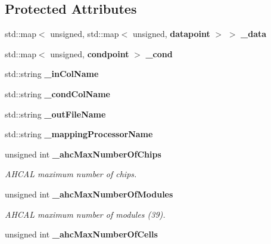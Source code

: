 \subsection*{Protected Attributes}
\begin{DoxyCompactItemize}
\item 
std::map$<$ unsigned, std::map$<$ unsigned, {\bf datapoint} $>$ $>$ {\bfseries \_\-data}\label{classExtractIntercalibrationProcessor_adf4e67f38b5b2e34e362fc2a03ed26f2}

\item 
std::map$<$ unsigned, {\bf condpoint} $>$ {\bfseries \_\-cond}\label{classExtractIntercalibrationProcessor_af577a1ce16643b016b6f8fda558f569b}

\item 
std::string {\bfseries \_\-inColName}\label{classExtractIntercalibrationProcessor_a19f78bf996da661aebc1b2c206e50d22}

\item 
std::string {\bfseries \_\-condColName}\label{classExtractIntercalibrationProcessor_a9e1ab65990412e158f8fccd23b63bc6a}

\item 
std::string {\bfseries \_\-outFileName}\label{classExtractIntercalibrationProcessor_a40723d9a2fbb028cea27a2bf99f35109}

\item 
std::string {\bfseries \_\-mappingProcessorName}\label{classExtractIntercalibrationProcessor_a61d61974a24f4cdd95599200e6c72d24}

\item 
unsigned int {\bf \_\-ahcMaxNumberOfChips}\label{classExtractIntercalibrationProcessor_ac5ad5bc2591002484d190cbe7c4934df}

\begin{DoxyCompactList}\small\item\em AHCAL maximum number of chips. \item\end{DoxyCompactList}\item 
unsigned int {\bf \_\-ahcMaxNumberOfModules}\label{classExtractIntercalibrationProcessor_af129cc6d6cd213cbab068f478e706b94}

\begin{DoxyCompactList}\small\item\em AHCAL maximum number of modules (39). \item\end{DoxyCompactList}\item 
unsigned int {\bf \_\-ahcMaxNumberOfCells}\label{classExtractIntercalibrationProcessor_a659e0f833a54e8389820d0fa6424b716}


\end{DoxyCompactItemize}
